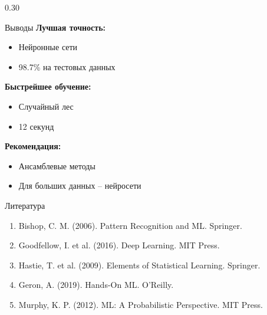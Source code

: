 \documentclass{beamer}
\begin{document}
\begin{frame}
\begin{columns}[t]
\begin{column}{0.30\textwidth}
\begin{block}{Выводы}
\textbf{Лучшая точность:}
\begin{itemize}
\item Нейронные сети
\item 98.7\% на тестовых данных
\end{itemize}
\textbf{Быстрейшее обучение:}
\begin{itemize}
\item Случайный лес
\item 12 секунд
\end{itemize}
\textbf{Рекомендация:}
\begin{itemize}
\item Ансамблевые методы
\item Для больших данных -- нейросети
\end{itemize}
\end{block}

\begin{block}{Литература}
\begin{enumerate}
\item Bishop, C. M. (2006). Pattern Recognition and ML. Springer.
\item Goodfellow, I. et al. (2016). Deep Learning. MIT Press.
\item Hastie, T. et al. (2009). Elements of Statistical Learning. Springer.
\item Geron, A. (2019). Hands-On ML. O'Reilly.
\item Murphy, K. P. (2012). ML: A Probabilistic Perspective. MIT Press.
\end{enumerate}
\end{block}
\end{column}

\end{columns}

\end{frame}
\end{document}
